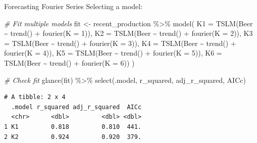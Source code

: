 \documentclass[
  ignorenonframetext,
]{beamer}
\newenvironment{Shaded}{\begin{snugshade}}{\end{snugshade}}
\newcommand{\AttributeTok}[1]{\textcolor[rgb]{0.77,0.63,0.00}{#1}}
\newcommand{\CommentTok}[1]{\textcolor[rgb]{0.56,0.35,0.01}{\textit{#1}}}
\newcommand{\DecValTok}[1]{\textcolor[rgb]{0.00,0.00,0.81}{#1}}
\newcommand{\FunctionTok}[1]{\textcolor[rgb]{0.00,0.00,0.00}{#1}}
\newcommand{\NormalTok}[1]{#1}
\newcommand{\OtherTok}[1]{\textcolor[rgb]{0.56,0.35,0.01}{#1}}
\newcommand{\SpecialCharTok}[1]{\textcolor[rgb]{0.00,0.00,0.00}{#1}}
\begin{document}
\begin{frame}[fragile]{Forecasting \textbar{} \small Fourier Series}
\protect\hypertarget{forecasting-fourier-series-3}{}
Selecting a model:

\tiny

\begin{Shaded}
\begin{Highlighting}[]
\CommentTok{\# Fit multiple models}
\NormalTok{fit }\OtherTok{\textless{}{-}}\NormalTok{ recent\_production }\SpecialCharTok{\%\textgreater{}\%}
  \FunctionTok{model}\NormalTok{(}
    \AttributeTok{K1 =} \FunctionTok{TSLM}\NormalTok{(Beer }\SpecialCharTok{\textasciitilde{}} \FunctionTok{trend}\NormalTok{() }\SpecialCharTok{+} \FunctionTok{fourier}\NormalTok{(}\AttributeTok{K =} \DecValTok{1}\NormalTok{)),}
    \AttributeTok{K2 =} \FunctionTok{TSLM}\NormalTok{(Beer }\SpecialCharTok{\textasciitilde{}} \FunctionTok{trend}\NormalTok{() }\SpecialCharTok{+} \FunctionTok{fourier}\NormalTok{(}\AttributeTok{K =} \DecValTok{2}\NormalTok{)),}
    \AttributeTok{K3 =} \FunctionTok{TSLM}\NormalTok{(Beer }\SpecialCharTok{\textasciitilde{}} \FunctionTok{trend}\NormalTok{() }\SpecialCharTok{+} \FunctionTok{fourier}\NormalTok{(}\AttributeTok{K =} \DecValTok{3}\NormalTok{)),}
    \AttributeTok{K4 =} \FunctionTok{TSLM}\NormalTok{(Beer }\SpecialCharTok{\textasciitilde{}} \FunctionTok{trend}\NormalTok{() }\SpecialCharTok{+} \FunctionTok{fourier}\NormalTok{(}\AttributeTok{K =} \DecValTok{4}\NormalTok{)),}
    \AttributeTok{K5 =} \FunctionTok{TSLM}\NormalTok{(Beer }\SpecialCharTok{\textasciitilde{}} \FunctionTok{trend}\NormalTok{() }\SpecialCharTok{+} \FunctionTok{fourier}\NormalTok{(}\AttributeTok{K =} \DecValTok{5}\NormalTok{)),}
    \AttributeTok{K6 =} \FunctionTok{TSLM}\NormalTok{(Beer }\SpecialCharTok{\textasciitilde{}} \FunctionTok{trend}\NormalTok{() }\SpecialCharTok{+} \FunctionTok{fourier}\NormalTok{(}\AttributeTok{K =} \DecValTok{6}\NormalTok{))}
\NormalTok{  )}

\CommentTok{\# Check fit}
\FunctionTok{glance}\NormalTok{(fit) }\SpecialCharTok{\%\textgreater{}\%} \FunctionTok{select}\NormalTok{(.model, r\_squared, adj\_r\_squared, AICc)}
\end{Highlighting}
\end{Shaded}

\begin{verbatim}
# A tibble: 2 x 4
  .model r_squared adj_r_squared  AICc
  <chr>      <dbl>         <dbl> <dbl>
1 K1         0.818         0.810  441.
2 K2         0.924         0.920  379.
\end{verbatim}

\normalfont
\end{frame}
\end{document}
